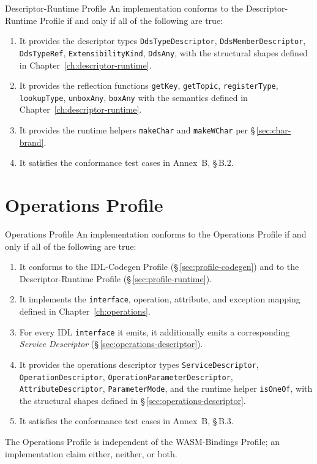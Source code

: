 \documentclass{../styles/zerodds-vendor-spec}
\begin{document}
\begin{conformance}{Descriptor-Runtime Profile}
An implementation conforms to the Descriptor-Runtime Profile if
and only if all of the following are true:
\begin{enumerate}
  \item It provides the descriptor types
        \texttt{DdsTypeDescriptor}, \texttt{DdsMemberDescriptor},
        \texttt{DdsTypeRef}, \texttt{ExtensibilityKind},
        \texttt{DdsAny}, with the structural shapes defined in
        Chapter~\ref{ch:descriptor-runtime}.
  \item It provides the reflection functions
        \texttt{getKey}, \texttt{getTopic}, \texttt{registerType},
        \texttt{lookupType}, \texttt{unboxAny}, \texttt{boxAny}
        with the semantics defined in
        Chapter~\ref{ch:descriptor-runtime}.
  \item It provides the runtime helpers \texttt{makeChar} and
        \texttt{makeWChar} per \S\,\ref{sec:char-brand}.
  \item It satisfies the conformance test cases in Annex~B,
        \S\,B.2.
\end{enumerate}
\end{conformance}

\section{Operations Profile}\label{sec:profile-operations}

\begin{conformance}{Operations Profile}
An implementation conforms to the Operations Profile if and only
if all of the following are true:
\begin{enumerate}
  \item It conforms to the IDL-Codegen Profile
        (\S\,\ref{sec:profile-codegen}) and to the
        Descriptor-Runtime Profile
        (\S\,\ref{sec:profile-runtime}).
  \item It implements the \texttt{interface}, operation,
        attribute, and exception mapping defined in
        Chapter~\ref{ch:operations}.
  \item For every IDL \texttt{interface} it emits, it additionally
        emits a corresponding \emph{Service Descriptor}
        (\S\,\ref{sec:operations-descriptor}).
  \item It provides the operations descriptor types
        \texttt{ServiceDescriptor}, \texttt{OperationDescriptor},
        \texttt{OperationParameterDescriptor},
        \texttt{AttributeDescriptor}, \texttt{ParameterMode},
        and the runtime helper \texttt{isOneOf}, with the
        structural shapes defined in
        \S\,\ref{sec:operations-descriptor}.
  \item It satisfies the conformance test cases in Annex~B,
        \S\,B.3.
\end{enumerate}
The Operations Profile is independent of the WASM-Bindings
Profile; an implementation  claim either, neither, or
both.
\end{conformance}
\end{document}
